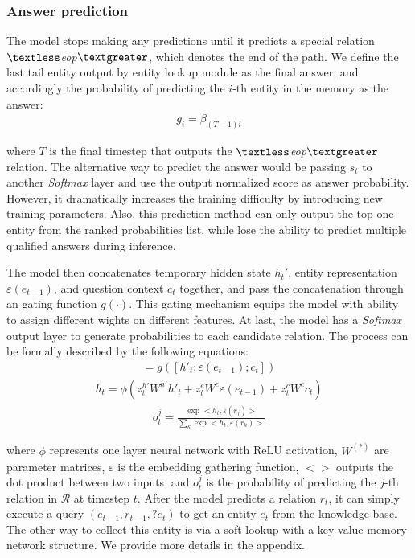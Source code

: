 \subsubsection{Answer prediction} The model stops making any predictions until it predicts a special relation \textit{$\textless$eop$\textgreater$}, which denotes the end of the path. We define the last tail entity output by entity lookup module as the final answer, and accordingly the probability of predicting the $i$-th entity in the memory as the answer:
\begin{align}
g_i = \beta_{(T-1)i}
\label{eq:e_prob}
\end{align}

where $T$ is the final timestep that outputs the \textit{$\textless$eop$\textgreater$} relation. The alternative way to predict the answer would be passing $s_t$ to another \textit{Softmax} layer and use the output normalized score as answer probability. However, it dramatically increases the training difficulty by introducing new training parameters. Also, this prediction method can only output the top one entity from the ranked probabilities list, while lose the ability to predict multiple qualified answers during inference. 





The model then concatenates temporary hidden state $h_{t}'$, entity representation $\varepsilon(e_{t-1})$, and question context $c_t$ together, and pass the concatenation through an gating function $g(\cdot)$. This gating mechanism equips the model with ability to assign different wights on different features. At last, the model has a \textit{Softmax} output layer to generate probabilities to each candidate relation.  The process can be formally described by the following equations:
\begin{align}
[z_t^{h'}, z_t^{e}, z_t^{c}] = g([h'_{t}; \varepsilon(e_{t-1}); c_t])
\end{align}
\vspace{-2ex}
\begin{align}
h_{t} = \phi(z^{h'}_tW^{h'}h'_{t}+z^{e}_t W^{e}\varepsilon(e_{t-1})+z^{c}_t W^{c}c_{t})
\end{align}
\vspace{-2ex}
\begin{align}
o^j_t = \frac{\exp <h_t,\varepsilon(r_j)>}{\sum_k\exp <h_t,\varepsilon(r_k)>}
\label{eq:r_prob}
\end{align}

where $\phi$ represents one layer neural network with ReLU activation, $W^{(*)}$ are parameter matrices, $\varepsilon$ is the embedding gathering function, $<>$ outputs the dot product between two inputs, and $o_t^j$ is the probability of predicting the $j$-th relation in $\mathcal{R}$ at timestep $t$. After the model predicts a relation $r_t$, it can simply execute a query $(e_{t-1}, r_{t-1}, ?e_t)$ to get an entity $e_t$ from the knowledge base. The other way to collect this entity is via a soft lookup with a key-value memory network structure. We provide more details in the appendix.


